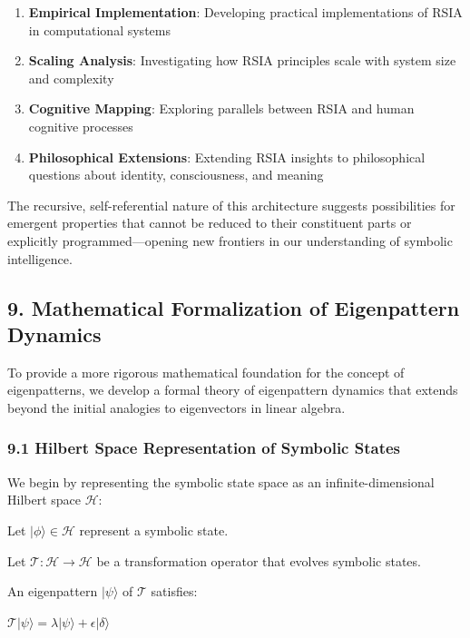 \documentclass[12pt]{article}
\providecommand{\tightlist}{%
  \setlength{\itemsep}{0pt}\setlength{\parskip}{0pt}}
\begin{document}
\begin{enumerate}
\def\labelenumi{\arabic{enumi}.}
\tightlist
\item
  \textbf{Empirical Implementation}: Developing practical
  implementations of RSIA in computational systems
\item
  \textbf{Scaling Analysis}: Investigating how RSIA principles scale
  with system size and complexity
\item
  \textbf{Cognitive Mapping}: Exploring parallels between RSIA and human
  cognitive processes
\item
  \textbf{Philosophical Extensions}: Extending RSIA insights to
  philosophical questions about identity, consciousness, and meaning
\end{enumerate}

The recursive, self-referential nature of this architecture suggests
possibilities for emergent properties that cannot be reduced to their
constituent parts or explicitly programmed---opening new frontiers in
our understanding of symbolic intelligence.

\subsection{9. Mathematical Formalization of Eigenpattern
Dynamics}\label{mathematical-formalization-of-eigenpattern-dynamics}

To provide a more rigorous mathematical foundation for the concept of
eigenpatterns, we develop a formal theory of eigenpattern dynamics that
extends beyond the initial analogies to eigenvectors in linear algebra.

\subsubsection{9.1 Hilbert Space Representation of Symbolic
States}\label{hilbert-space-representation-of-symbolic-states}

We begin by representing the symbolic state space as an
infinite-dimensional Hilbert space \(\mathcal{H}\):

Let \(|\phi\rangle \in \mathcal{H}\) represent a symbolic state.

Let \(\mathcal{T}: \mathcal{H} \rightarrow \mathcal{H}\) be a
transformation operator that evolves symbolic states.

An eigenpattern \(|\psi\rangle\) of \(\mathcal{T}\) satisfies:

\(\mathcal{T}|\psi\rangle = \lambda|\psi\rangle + \epsilon|\delta\rangle\)
\end{document}
